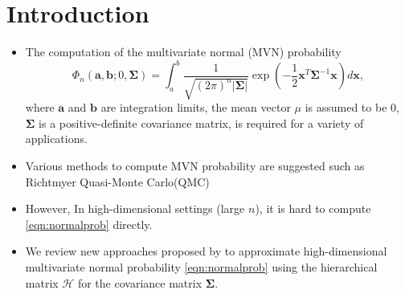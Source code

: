 \section{Introduction}

\begin{frame}{\secname}

    \begin{itemize}
        \item The computation of the multivariate normal (MVN) probability 
        \begin{equation}\label{eqn:normalprob}
            \Phi_n(\mathbf{a}, \mathbf{b}; 0, \boldsymbol{\Sigma}) = \int_a^b \frac{1}{\sqrt{(2\pi)^n |\boldsymbol{\Sigma}|}} \exp\left( -\frac{1}{2} \mathbf{x}^T \boldsymbol{\Sigma}^{-1} \mathbf{x} \right) d\mathbf{x},
        \end{equation}
        where $\mathbf{a}$ and $\mathbf{b}$ are integration limits, the mean vector $\mu$ is assumed to be 0, $\boldsymbol{\Sigma}$ is a positive-definite covariance matrix, is required for a variety of applications. 
        \item Various methods to compute MVN probability are suggested such as Richtmyer Quasi-Monte Carlo(QMC) \citep{genz2009computation}
        \item However, In high-dimensional settings (large $n$), it is hard to compute \eqref{eqn:normalprob} directly.
        \item We review new approaches proposed by \citet{cao2019hierarchical} to approximate high-dimensional multivariate normal probability \eqref{eqn:normalprob}
        using the hierarchical matrix $\mathcal{H}$ \citep{hackbusch2015hierarchical} for the covariance matrix $\boldsymbol{\Sigma}$. 
    \end{itemize}
    
\end{frame}

